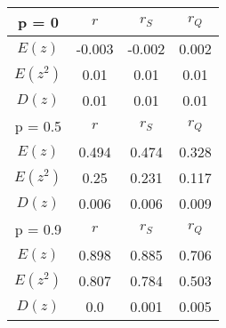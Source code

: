 \begin{tabular}{| c | c | c | c |} \hline 
 p = 0 & $r$ & $r_{S}$ & $r_{Q}$ \\ \hline 
 $E(z)$ & -0.003 & -0.002 & 0.002 \\ \hline 
 $E(z^2)$ & 0.01 & 0.01 & 0.01 \\ \hline 
 $D(z)$ & 0.01 & 0.01 & 0.01 \\ \hline 
 p = 0.5 & $r$ & $r_{S}$ & $r_{Q}$ \\ \hline 
 $E(z)$ & 0.494 & 0.474 & 0.328 \\ \hline 
 $E(z^2)$ & 0.25 & 0.231 & 0.117 \\ \hline 
 $D(z)$ & 0.006 & 0.006 & 0.009 \\ \hline 
 p = 0.9 & $r$ & $r_{S}$ & $r_{Q}$ \\ \hline 
 $E(z)$ & 0.898 & 0.885 & 0.706 \\ \hline 
 $E(z^2)$ & 0.807 & 0.784 & 0.503 \\ \hline 
 $D(z)$ & 0.0 & 0.001 & 0.005 \\ \hline 
 \end{tabular} 

